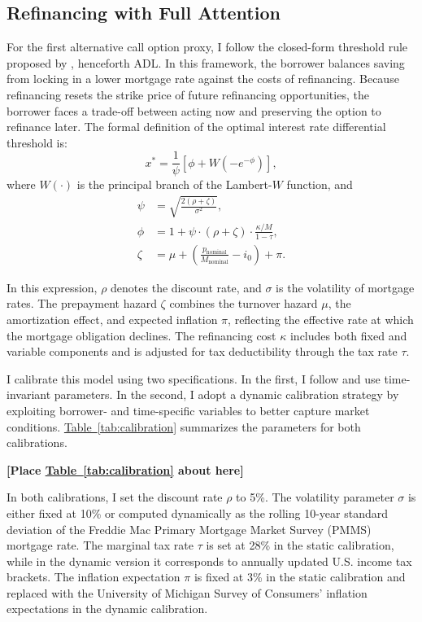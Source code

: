 \documentclass[11pt]{article}
\begin{document}
{\subsection{Refinancing with Full Attention}
For the first alternative call option proxy, I follow the closed-form threshold rule proposed by \citet{agarwal2013optimal}, henceforth ADL. In this framework, the borrower balances saving from locking in a lower mortgage rate against the costs of refinancing. Because refinancing resets the strike price of future refinancing opportunities, the borrower faces a trade-off between acting now and preserving the option to refinance later. The formal definition of the optimal interest rate differential threshold is:
\begin{equation}
x^* = \frac{1}{\psi} \left[ \phi + W \left( - e^{ - \phi } \right) \right],
\end{equation}
where $W(\cdot)$ is the principal branch of the Lambert-$W$ function, and
\begin{align*}
\psi &= \sqrt{ \frac{ 2(\rho + \zeta) }{ \sigma^2 } }, \\
\phi &= 1 + \psi \cdot (\rho + \zeta) \cdot \frac{ \kappa/M }{ 1 - \tau }, \\
\zeta &= \mu + \left( \frac{ p_{\text{nominal}} }{ M_{\text{nominal}} } - i_0 \right) + \pi.
\end{align*}

In this expression, $\rho$ denotes the discount rate, and $\sigma$ is the volatility of mortgage rates. The prepayment hazard $\zeta$ combines the turnover hazard $\mu$, the amortization effect, and expected inflation $\pi$, reflecting the effective rate at which the mortgage obligation declines. The refinancing cost $\kappa$ includes both fixed and variable components and is adjusted for tax deductibility through the tax rate $\tau$.


I calibrate this model using two specifications. In the first, I follow \citet{agarwal2013optimal} and use time-invariant parameters. In the second, I adopt a dynamic calibration strategy by exploiting borrower- and time-specific variables to better capture market conditions. \hyperref[tab:calibration]{Table~\ref*{tab:calibration}} summarizes the parameters for both calibrations.

\bigskip
\centerline{\bf [Place \hyperref[tab:calibration]{Table~\ref*{tab:calibration}} about here]}
\bigskip

In both calibrations, I set the discount rate $\rho$ to 5\%. The volatility parameter $\sigma$ is either fixed at 10\% or computed dynamically as the rolling 10-year standard deviation of the Freddie Mac Primary Mortgage Market Survey (PMMS) mortgage rate. The marginal tax rate $\tau$ is set at 28\% in the static calibration, while in the dynamic version it corresponds to annually updated U.S. income tax brackets. The inflation expectation $\pi$ is fixed at 3\% in the static calibration and replaced with the University of Michigan Survey of Consumers' inflation expectations in the dynamic calibration.

}
\end{document}
